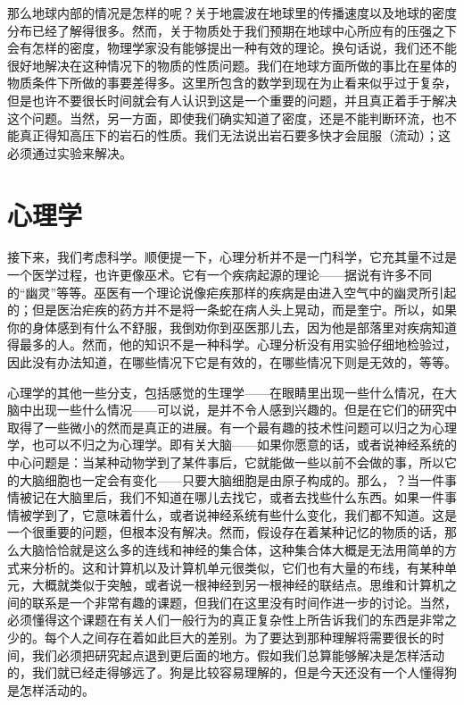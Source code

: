那么地球内部的情况是怎样的呢？关于地震波在地球里的传播速度以及地球的密度分布已经了解得很多。然而，关于物质处于我们预期在地球中心所应有的压强之下会有怎样的密度，物理学家没有能够提出一种有效的理论。换句话说，我们还不能很好地解决在这种情况下的物质的性质问题。我们在地球方面所做的事比在星体的物质条件下所做的事要差得多。这里所包含的数学到现在为止看来似乎过于复杂，但是也许不要很长时间就会有人认识到这是一个重要的问题，并且真正着手于解决这个问题。当然，另一方面，即使我们确实知道了密度，还是不能判断环流，也不能真正得知高压下的岩石的性质。我们无法说出岩石要多快才会屈服（流动）；这必须通过实验来解决。


\section{心理学}

接下来，我们考虑科学。顺便提一下，心理分析并不是一门科学，它充其量不过是一个医学过程，也许更像巫术。它有一个疾病起源的理论——据说有许多不同的“幽灵”等等。巫医有一个理论说像疟疾那样的疾病是由进入空气中的幽灵所引起的；但是医治疟疾的药方并不是将一条蛇在病人头上晃动，而是奎宁。所以，如果你的身体感到有什么不舒服，我倒劝你到巫医那儿去，因为他是部落里对疾病知道得最多的人。然而，他的知识不是一种科学。心理分析没有用实验仔细地检验过，因此没有办法知道，在哪些情况下它是有效的，在哪些情况下则是无效的，等等。

心理学的其他一些分支，包括感觉的生理学——在眼睛里出现一些什么情况，在大脑中出现一些什么情况——可以说，是并不令人感到兴趣的。但是在它们的研究中取得了一些微小的然而是真正的进展。有一个最有趣的技术性问题可以归之为心理学，也可以不归之为心理学。即有关大脑——如果你愿意的话，或者说神经系统的中心问题是：当某种动物学到了某件事后，它就能做一些以前不会做的事，所以它的大脑细胞也一定会有变化——只要大脑细胞是由原子构成的。那么，？当一件事情被记在大脑里后，我们不知道在哪儿去找它，或者去找些什么东西。如果一件事情被学到了，它意味着什么，或者说神经系统有些什么变化，我们都不知道。这是一个很重要的问题，但根本没有解决。然而，假设存在着某种记忆的物质的话，那么大脑恰恰就是这么多的连线和神经的集合体，这种集合体大概是无法用简单的方式来分析的。这和计算机以及计算机单元很类似，它们也有大量的布线，有某种单元，大概就类似于突触，或者说一根神经到另一根神经的联结点。思维和计算机之间的联系是一个非常有趣的课题，但我们在这里没有时间作进一步的讨论。当然，必须懂得这个课题在有关人们一般行为的真正复杂性上所告诉我们的东西是非常之少的。每个人之间存在着如此巨大的差别。为了要达到那种理解将需要很长的时间，我们必须把研究起点退到更后面的地方。假如我们总算能够解决是怎样活动的，我们就已经走得够远了。狗是比较容易理解的，但是今天还没有一个人懂得狗是怎样活动的。



